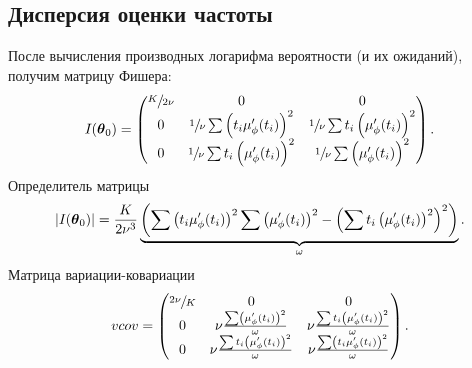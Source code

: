 
\subsection{Дисперсия оценки частоты}
После вычисления производных логарифма вероятности (и их ожиданий), получим матрицу Фишера: 
\[
\Fisher = \begin{pmatrix}
\sfrac{K}{2\nu} & 0 								& 0 \\
0 				& \sfrac1\nu\sum\bkt{t_i\mupp}^2	& \sfrac1\nu\sum t_i\bkt{\mupp}^2 \\
0				& \sfrac1\nu\sum t_i\bkt{\mupp}^2	&\sfrac1\nu\sum\bkt{\mupp}^2
\end{pmatrix}.
\]
Определитель матрицы
\newcommand{\STM}{\w}
\[
|\Fisher| = \frac{K}{2\nu^3}\underbrace{\bkt{\sum\bkt{t_i\mupp}^2\sum\bkt{\mupp}^2 - \bkt{\sum t_i\bkt{\mupp}^2}^2}}_{\STM}.
\]
Матрица вариации-ковариации
\[
vcov = \begin{pmatrix}
\sfrac{2\nu}{K}& 0									& 0				\\
0				&\nu\frac{\sum\bkt{\mupp}^2}{\STM}		&\nu\frac{\sum t_i\bkt{\mupp}^2}{\STM}\\
0				&\nu\frac{\sum t_i\bkt{\mupp}^2}{\STM}	&\nu\frac{\sum\bkt{t_i\mupp}^2}{\STM}
\end{pmatrix}.
\]

